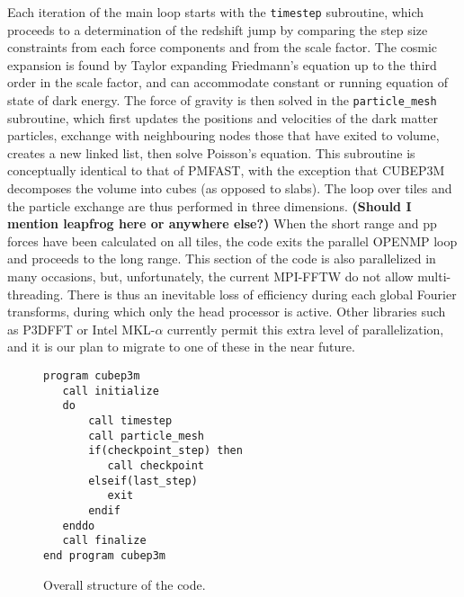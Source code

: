 Each iteration of the main loop starts with the {\tt timestep} subroutine, 
which proceeds to a determination of the redshift jump by comparing the step size constraints from each
force components and from the scale factor.
The cosmic expansion is found by Taylor expanding Friedmann's equation up to the third order in the scale factor,
and can accommodate constant or running equation of state of dark energy.
The force of gravity is then solved  in the {\tt particle\_mesh} subroutine,
which first updates the positions and velocities of the dark matter particles, exchange with neighbouring nodes those that have exited to volume,
creates a new linked list, then solve Poisson's equation.  This subroutine is conceptually identical to that of {\small PMFAST}, 
with the exception  that {\small CUBEP3M} decomposes the volume into cubes (as opposed to slabs). 
The loop over tiles and the particle exchange are thus performed in three dimensions.
{\bf (Should I mention leapfrog here or anywhere else?)}
When the short range and pp forces have been calculated on all tiles, the code exits the parallel {\small OPENMP} loop
and proceeds to the long range. This section of the code is also parallelized in many occasions, but, unfortunately, the current {\small MPI-FFTW}
do not allow multi-threading. There is thus an inevitable loss of efficiency during each global Fourier transforms, during which
only the head processor is active. Other libraries such as {\small P3DFFT} or  Intel {\small MKL-$\alpha$} currently permit this extra level of parallelization,
and it is our plan to migrate to one of these in the near future.

\begin{figure}
\begin{verbatim}
program cubep3m
   call initialize
   do
       call timestep
       call particle_mesh
       if(checkpoint_step) then
          call checkpoint
       elseif(last_step)
          exit
       endif
   enddo
   call finalize
end program cubep3m
\end{verbatim}
\caption{Overall structure of the code.}
\label{fig:structure}
\end{figure}

